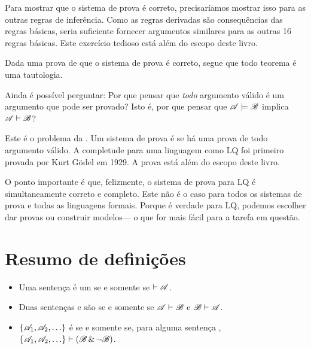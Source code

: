 Para mostrar que o sistema de prova é correto, precisaríamos mostrar isso para as outras regras de inferência. Como as regras derivadas são consequências das regras básicas, seria suficiente fornecer argumentos similares para as outras 16 regras básicas. Este exercício tedioso está além do escopo deste livro.

Dada uma prova de que o sistema de prova é correto, segue que todo teorema é uma tautologia.

Ainda é possível perguntar: Por que pensar que \emph{todo} argumento válido é um argumento que pode ser provado?  Isto é, por que pensar que $\mathscr{A}\models\mathscr{B}$ implica $\mathscr{A}\vdash\mathscr{B}$?

Este é o problema da . Um sistema de prova é  se há uma prova de todo argumento válido. A completude para uma linguagem como LQ foi primeiro provada por Kurt G\"odel em 1929. A prova está além do escopo deste livro.

O ponto importante é que, felizmente, o sistema de prova para LQ é simultaneamente correto e completo. Este não é o caso para todos os sistemas de prova e todas as linguagens formais. Porque é verdade para LQ, podemos escolher dar provas ou construir modelos--- o que for mais fácil para a tarefa em questão.




\section*{Resumo de definições}
\begin{itemize}
\item Uma sentença  é um  se e somente se $\vdash\mathscr{A}$.

\item Duas sentenças  e  são  se e somente se $\mathscr{A}\vdash\mathscr{B}$ e $\mathscr{B}\vdash\mathscr{A}$.

\item $\{\mathscr{A}_1,\mathscr{A}_2,\ldots\}$ é  se e somente se, para alguma sentença , $\{\mathscr{A}_1,\mathscr{A}_2,\ldots\}\vdash(\mathscr{B} \,\&\, \neg \mathscr{B})$.
\end{itemize}



\practiceproblems


